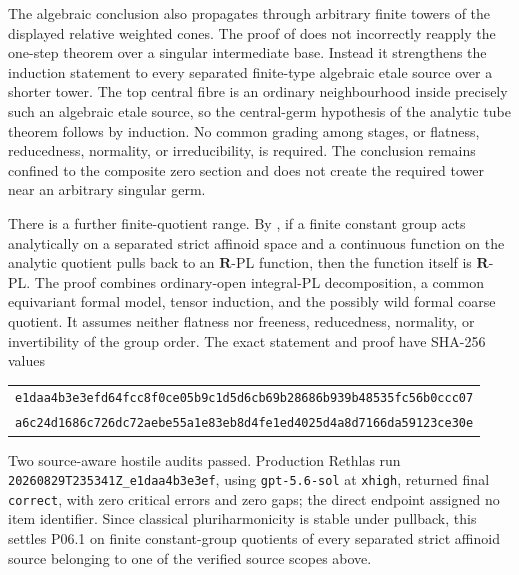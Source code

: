 The algebraic conclusion also propagates through arbitrary finite towers of
the displayed relative weighted cones.  The proof of
 does not incorrectly
reapply the one-step theorem over a singular intermediate base.  Instead it
strengthens the induction statement to every separated finite-type algebraic
etale source over a shorter tower.  The top central fibre is an ordinary
neighbourhood inside precisely such an algebraic etale source, so the
central-germ hypothesis of the analytic tube theorem follows by induction.
No common grading among stages, or flatness, reducedness, normality, or
irreducibility, is required.  The conclusion remains confined to the
composite zero section and does not create the required tower near an
arbitrary singular germ.

There is a further finite-quotient range.  By
, if a finite constant
group acts analytically on a separated strict affinoid space and a continuous
function on the analytic quotient pulls back to an \(\mathbf R\)-PL function,
then the function itself is \(\mathbf R\)-PL.  The proof combines
ordinary-open integral-PL decomposition, a common equivariant formal model,
tensor induction, and the possibly wild formal coarse quotient.  It assumes
neither flatness nor freeness, reducedness, normality, or invertibility of the
group order.  The exact statement and proof have SHA-256 values
\begin{center}
\small
\begin{tabular}{@{}c@{}}
\nolinkurl{e1daa4b3e3efd64fcc8f0ce05b9c1d5d6cb69b28686b939b48535fc56b0ccc07}\\
\nolinkurl{a6c24d1686c726dc72aebe55a1e83eb8d4fe1ed4025d4a8d7166da59123ce30e}
\end{tabular}
\end{center}
Two source-aware hostile audits passed.  Production Rethlas run
\nolinkurl{20260829T235341Z_e1daa4b3e3ef}, using
\texttt{gpt-5.6-sol} at \texttt{xhigh}, returned final
\texttt{correct}, with zero critical errors and zero gaps; the direct
endpoint assigned no item identifier.  Since classical pluriharmonicity is
stable under pullback, this settles P06.1 on finite constant-group quotients
of every separated strict affinoid source belonging to one of the verified
source scopes above.

